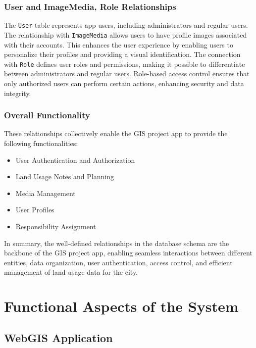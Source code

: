 \subsubsection{User and ImageMedia, Role Relationships}
The \texttt{User} table represents app users, including administrators and regular users. The relationship with \texttt{ImageMedia} allows users to have profile images associated with their accounts. This enhances the user experience by enabling users to personalize their profiles and providing a visual identification. The connection with \texttt{Role} defines user roles and permissions, making it possible to differentiate between administrators and regular users. Role-based access control ensures that only authorized users can perform certain actions, enhancing security and data integrity.

\subsubsection{Overall Functionality}
These relationships collectively enable the GIS project app to provide the following functionalities:

\begin{itemize}
    \item User Authentication and Authorization
    \item Land Usage Notes and Planning
    \item Media Management
    \item User Profiles
    \item Responsibility Assignment
\end{itemize}

In summary, the well-defined relationships in the database schema are the backbone of the GIS project app, enabling seamless interactions between different entities, data organization, user authentication, access control, and efficient management of land usage data for the city.


\section{Functional Aspects of the System}\label{sec:functional-aspects-of-the-system}
\subsection{WebGIS Application}\label{subsec:fa-webgis-application}

